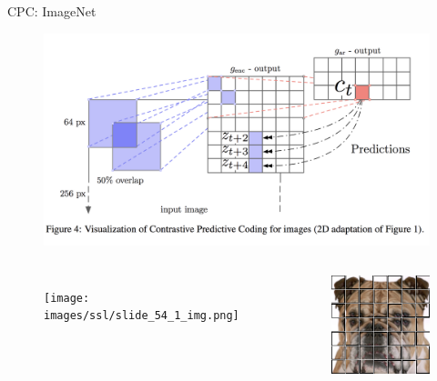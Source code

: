 \begin{frame}[allowframebreaks]{CPC: ImageNet}
    \begin{figure}
        \centering
        \includegraphics[width=1\linewidth,height=0.9\textheight,keepaspectratio]{images/ssl/slide_53_1_img.png}
    \end{figure}

    \framebreak

    \begin{columns}
        \begin{figure}
            \centering
            \texttt{[image: images/ssl/slide\_54\_1\_img.png]}
        \end{figure}

        \begin{figure}
            \centering
            \includegraphics[width=1\linewidth,height=0.9\textheight,keepaspectratio]{images/ssl/slide_54_2_img.png}
        \end{figure}
    \end{columns}


\end{frame}
